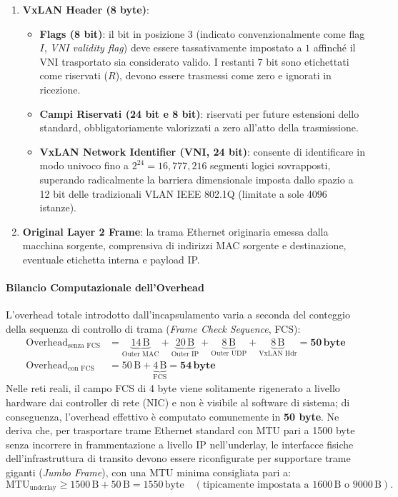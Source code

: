 \documentclass[11pt, a4paper]{article}
\begin{document}
\begin{enumerate}
\begin{itemize}[noitemsep]
    \end{itemize}
    \item \textbf{VxLAN Header (8 byte)}:
    \begin{itemize}[noitemsep]
        \item \textbf{Flags (8 bit)}: il bit in posizione 3 (indicato convenzionalmente come flag $I$, \emph{VNI validity flag}) deve essere tassativamente impostato a $1$ affinché il VNI trasportato sia considerato valido. I restanti 7 bit sono etichettati come riservati ($R$), devono essere trasmessi come zero e ignorati in ricezione.
        \item \textbf{Campi Riservati (24 bit e 8 bit)}: riservati per future estensioni dello standard, obbligatoriamente valorizzati a zero all'atto della trasmissione.
        \item \textbf{VxLAN Network Identifier (VNI, 24 bit)}: consente di identificare in modo univoco fino a $2^{24} = 16{,}777{,}216$ segmenti logici sovrapposti, superando radicalmente la barriera dimensionale imposta dallo spazio a 12 bit delle tradizionali VLAN IEEE 802.1Q (limitate a sole 4096 istanze).
    \end{itemize}
    \item \textbf{Original Layer 2 Frame}: la trama Ethernet originaria emessa dalla macchina sorgente, comprensiva di indirizzi MAC sorgente e destinazione, eventuale etichetta interna e payload IP.
\end{enumerate}

\paragraph{Bilancio Computazionale dell'Overhead}
L'overhead totale introdotto dall'incapsulamento varia a seconda del conteggio della sequenza di controllo di trama (\emph{Frame Check Sequence}, FCS):
\begin{align*}
    \text{Overhead}_{\text{senza FCS}} &= \underbrace{14\,\text{B}}_{\text{Outer MAC}} + \underbrace{20\,\text{B}}_{\text{Outer IP}} + \underbrace{8\,\text{B}}_{\text{Outer UDP}} + \underbrace{8\,\text{B}}_{\text{VxLAN Hdr}} = \mathbf{50\,\text{byte}} \\
    \text{Overhead}_{\text{con FCS}} &= 50\,\text{B} + \underbrace{4\,\text{B}}_{\text{FCS}} = \mathbf{54\,\text{byte}}
\end{align*}
Nelle reti reali, il campo FCS di 4 byte viene solitamente rigenerato a livello hardware dai controller di rete (NIC) e non è visibile al software di sistema; di conseguenza, l'overhead effettivo è computato comunemente in \textbf{50 byte}. Ne deriva che, per trasportare trame Ethernet standard con MTU pari a 1500 byte senza incorrere in frammentazione a livello IP nell'underlay, le interfacce fisiche dell'infrastruttura di transito devono essere riconfigurate per supportare trame giganti (\emph{Jumbo Frame}), con una MTU minima consigliata pari a:
\[
    \text{MTU}_{\text{underlay}} \ge 1500\,\text{B} + 50\,\text{B} = 1550\,\text{byte} \quad (\text{tipicamente impostata a } 1600\,\text{B o } 9000\,\text{B}).
\]
\end{document}
